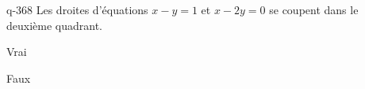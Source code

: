 \begin{truefalse}{q-368}
Les droites d'équations $x-y=1$ et $x-2y=0$ se coupent dans le deuxième quadrant.
\item Vrai
\item* Faux
\end{truefalse}

